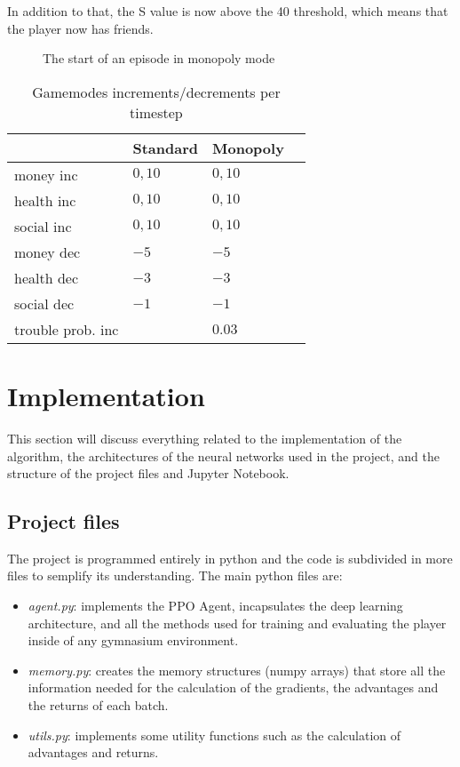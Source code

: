 \documentclass{article}
\begin{document}
In addition to that, the S value is now above the 40 threshold, which means that the player now has friends.


\begin{figure}
  \centering
  \caption{The start of an episode in monopoly mode}
  \label{fig:A}
\end{figure}

\begin{table}
  \caption{Gamemodes increments/decrements per timestep}
  \label{gm_behaviour}
  \centering
  \begin{tabular}{llll}
    \toprule
    & Standard     & Monopoly                           \\
    \midrule
    money inc           & \(0,10\)      & \(0,10\)      \\
    health inc          & \(0,10\)      & \(0,10\)      \\
    social inc          & \(0,10\)      & \(0,10\)      \\
    money dec           & \(-5\)        & \(-5\)        \\
    health dec          & \(-3\)        & \(-3\)        \\
    social dec          & \(-1\)        & \(-1\)        \\
    trouble prob. inc   &               & \(0.03\)      \\
    \bottomrule
  \end{tabular}
\end{table}


\section{Implementation}
This section will discuss everything related to the implementation of the algorithm, the architectures of the neural networks used in the project, and the structure of the project files and Jupyter Notebook.

\subsection{Project files}
The project is programmed entirely in python and the code is subdivided in more files to semplify its understanding. The main python files are:

\begin{itemize}
    \item \textit{agent.py}: implements the PPO Agent, incapsulates the deep learning architecture, and all the methods used for training and evaluating the player inside of any gymnasium environment.
    \item \textit{memory.py}: creates the memory structures (numpy arrays) that store all the information needed for the calculation of the gradients, the advantages and the returns of each batch.
    \item \textit{utils.py}: implements some utility functions such as the calculation of advantages and returns.
\end{itemize}
\end{document}
